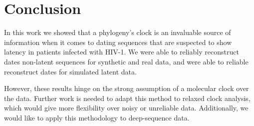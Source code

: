 \section{Conclusion} \label{sec:conclusion}
In this work we showed that a phylogeny's clock is an invaluable source of information when it comes to dating sequences that are suspected to show latency in patients infected with HIV-1. We were able to reliably reconstruct dates non-latent sequences for synthetic and real data, and were able to reliable reconstruct dates for simulated latent data. 

However, these results hinge on the strong assumption of a molecular clock over the data. Further work is needed to adapt this method to relaxed clock analysis, which would give more flexibility over noisy or unreliable data. Additionally, we would like to apply this methodology to deep-sequence data.
